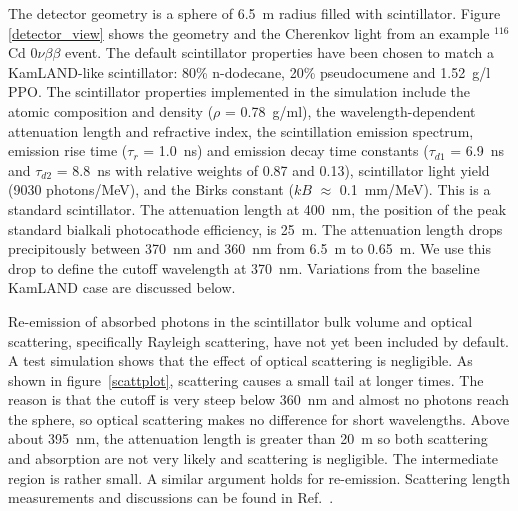\documentclass[cits]{JINST}
\begin{document}
The detector geometry is a sphere of 6.5~m radius filled with
scintillator. Figure \ref{detector_view} shows the geometry and the
Cherenkov light from an example $^{116}$Cd $0\nu\beta\beta$ event. The
default scintillator properties have been chosen to match a KamLAND-like
scintillator\cite{kamland2003}: 80\% n-dodecane, 20\% pseudocumene and 1.52~g/l PPO. The
scintillator properties implemented in the simulation include the
atomic composition and density ($\rho$ = 0.78~g/ml), the
wavelength-dependent attenuation length\cite{tajimaMaster} and
refractive index\cite{OlegThesis}, the scintillation emission
spectrum\cite{tajimaMaster}, emission rise time ($\tau_r$ = 1.0~ns)
and emission decay time constants ($\tau_{d1}$ = 6.9~ns and
$\tau_{d2}$ = 8.8~ns with relative weights of 0.87 and 
0.13)\cite{tajimaThesis}, scintillator light yield (9030 photons/MeV),
and the Birks constant ($kB$ $\approx$ 0.1~mm/MeV)\cite{ChrisThesis}.  This is a standard scintillator. The attenuation length at 400~nm, the position of the peak standard bialkali photocathode efficiency, is 25~m. The attenuation length drops precipitously between 370~nm and 360~nm from 6.5~m to 0.65~m. We use this drop to define the cutoff wavelength at 370~nm. Variations from the baseline KamLAND case are discussed below. 

Re-emission of absorbed photons in the scintillator
bulk volume and optical scattering, specifically Rayleigh scattering, have not yet been included by default. A test simulation shows that the effect of optical scattering is negligible. As shown in figure~\ref{scattplot}, scattering causes a small tail at longer times. The reason is that the cutoff is very steep below 360~nm and almost no photons reach the sphere, so optical scattering makes no difference for short wavelengths. Above about 395~nm, the attenuation length is greater than 20~m so both scattering and absorption are not very likely and scattering is negligible. The intermediate region is rather small. A similar argument holds for re-emission. Scattering length measurements and discussions can be found in Ref.~\cite{Wurm:2010ad}. 
\end{document}
